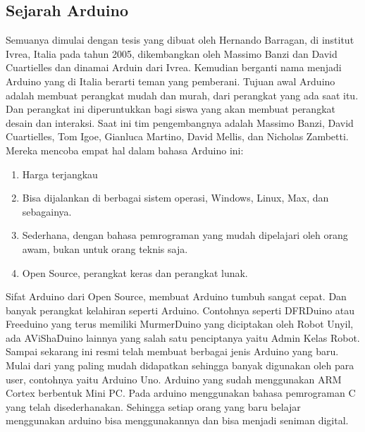 \subsection{Sejarah Arduino}
Semuanya dimulai dengan tesis yang dibuat oleh Hernando Barragan, di institut Ivrea, Italia pada tahun 2005, dikembangkan oleh Massimo Banzi dan David Cuartielles dan dinamai Arduin dari Ivrea. Kemudian berganti nama menjadi Arduino yang di Italia berarti teman yang pemberani.
Tujuan awal Arduino adalah membuat perangkat mudah dan murah, dari perangkat yang ada saat itu. Dan perangkat ini diperuntukkan bagi siswa yang akan membuat perangkat desain dan interaksi.
Saat ini tim pengembangnya adalah Massimo Banzi, David Cuartielles, Tom Igoe, Gianluca Martino, David Mellis, dan Nicholas Zambetti. Mereka mencoba empat hal dalam bahasa Arduino ini:
\begin{enumerate}
\item Harga terjangkau
\item Bisa dijalankan di berbagai sistem operasi, Windows, Linux, Max, dan sebagainya.
\item Sederhana, dengan bahasa pemrograman yang mudah dipelajari oleh orang awam, bukan untuk orang teknis saja.
\item Open Source, perangkat keras dan perangkat lunak.
\end{enumerate}
Sifat Arduino dari Open Source, membuat Arduino tumbuh sangat cepat. Dan banyak perangkat kelahiran seperti Arduino. Contohnya seperti DFRDuino atau Freeduino yang terus memiliki MurmerDuino yang diciptakan oleh Robot Unyil, ada AViShaDuino lainnya yang salah satu penciptanya yaitu Admin Kelas Robot.
Sampai sekarang ini resmi telah membuat berbagai jenis Arduino yang baru. Mulai dari yang paling mudah didapatkan sehingga banyak digunakan oleh para user, contohnya yaitu Arduino Uno. Arduino yang sudah menggunakan ARM Cortex berbentuk Mini PC. Pada arduino menggunakan bahasa pemrograman C yang telah disederhanakan. Sehingga setiap orang yang baru belajar menggunakan arduino bisa menggunakannya dan bisa menjadi seniman digital.

